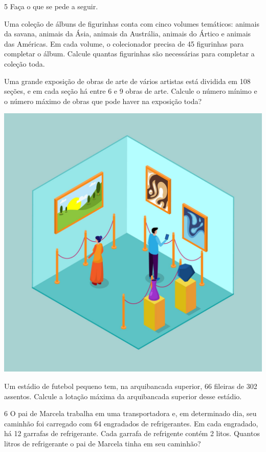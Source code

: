 \num{5} Faça o que se pede a seguir.

\begin{escolha}
\item Uma coleção de álbuns de figurinhas conta com cinco volumes temáticos: animais da savana, animais da Ásia, animais da Austrália, animais do Ártico e animais das Américas. Em cada volume, o colecionador precisa de 45 figurinhas para completar o álbum. Calcule quantas figurinhas são necessárias para completar a coleção toda.

\item Uma grande exposição de obras de arte de vários artistas está dividida em 108 seções, e em cada seção há entre 6 e 9 obras de arte. Calcule o número mínimo e o número máximo de obras que pode haver na exposição toda?

\begin{center}
\includegraphics[width=.5\textwidth]{media/image14c.jpeg}
\end{center}


\item Um estádio de futebol pequeno tem, na arquibancada superior, 66 fileiras de 302 assentos. Calcule a lotação máxima da arquibancada superior desse estádio.
\end{escolha}

\num{6} O pai de Marcela trabalha em uma transportadora e, em determinado
dia, seu caminhão foi carregado com 64 engradados de refrigerantes.
Em cada engradado, há 12 garrafas de refrigerante. Cada garrafa de refrigente
contém 2 litos. Quantos litros de refrigerante o pai de Marcela tinha em seu caminhão?

